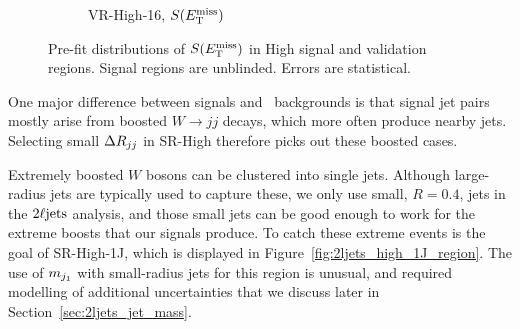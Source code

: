\begin{figure}[tp]
\begin{subfigure}{0.495\textwidth}
\caption{VR-High-16, $\metsig$}
\end{subfigure}
\caption[
Pre-fit distributions of $\metsig$ in High signal and validation regions
]{%
Pre-fit distributions of $\metsig$ in High signal and validation regions.
Signal regions are unblinded.
Errors are statistical.
}
\label{fig:2ljets_high_region}
\end{figure}

One major difference between signals and \diboson\ backgrounds is that signal
jet pairs mostly arise from boosted $W\to jj$ decays, which more often
produce nearby jets.
Selecting small $\Delta R_{jj}$ in SR-High therefore picks out these boosted cases.

Extremely boosted $W$ bosons can be clustered into single jets.
Although large-radius jets are typically used to capture these, we only use
small, $R=0.4$, jets in the $2\ell\mathrm{jets}$ analysis, and those small jets can
be good enough to work for the extreme boosts that our signals produce.
To catch these extreme events is the goal of SR-High-1J, which is displayed
in Figure~\ref{fig:2ljets_high_1J_region}.
The use of $m_{j_1}$ with small-radius jets for this region is unusual,
and required modelling of additional uncertainties that we discuss later in
Section~\ref{sec:2ljets_jet_mass}.

